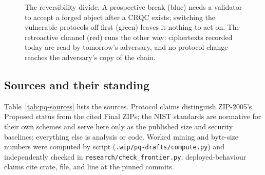 \documentclass[11pt,a4paper]{article}
\theoremstyle{definition}
\begin{document}
\begin{figure}[ht]
\centering
{}
\caption{The reversibility divide. A prospective break (blue) needs a
validator to accept a forged object after a CRQC exists; switching the
vulnerable protocols off first (green) leaves it nothing to act on. The
retroactive channel (red) runs the other way: ciphertexts recorded today
are read by tomorrow's adversary, and no protocol change reaches the
adversary's copy of the chain.}
\label{fig:pq-axis}
\end{figure}

\subsection{Sources and their standing}\label{sec:pq-sources}

Table~\ref{tab:pq-sources} lists the sources. Protocol claims distinguish
ZIP-2005's Proposed status from the cited Final ZIPs; the NIST standards are
normative for their own schemes and serve here only as the published
size and security baselines; everything else is analysis or code.
Worked mining and byte-size numbers were computed by script
(\texttt{.wip/pq-drafts/compute.py}) and independently checked in
\texttt{research/check\_frontier.py}; deployed-behaviour claims cite crate, file,
and line at the pinned commits.
\end{document}
